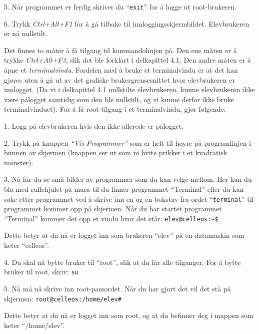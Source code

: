 \item{5.} N\aa r programmet er ferdig skriver du ``{\tt exit}'' for \aa{} logge ut root-brukeren.

\item{6.} Trykk {\it Ctrl+Alt+F1} for \aa{} g\aa{} tilbake til inn\-loggings\-skjerm\-bildet. Elev\-brukeren er n\aa{} nullstilt.


Det finnes to m\aa ter \aa{} f\aa{} tilgang til kommando\-linjen p\aa . Den ene m\aa ten er \aa{} trykke {\it Ctrl+Alt+F3}, slik det ble forklart i delkapittel 4.1. Den andre m\aa ten er \aa{} \aa pne et {\it terminalvindu}. Fordelen med \aa{} bruke et terminalvindu er at det kan gj\o res uten \aa{} g\aa{} ut av det grafiske brukergrensesnittet hvor elevbrukeren er innlogget. (Da vi i delkapittel 4.1 nullstilte elevbrukeren, kunne elevbrukeren ikke v\ae re p\aa logget samtidig som den ble nullstilt, og vi kunne derfor ikke bruke terminalvinduet). For \aa{} f\aa{} root-tilgang i et terminalvindu, gj\o r f\o lgende:
\item{1.} Logg p\aa{} elevbrukeren hvis den ikke allerede er p\aa logget.
\item{2.} Trykk p\aa{} knappen {\it ``Vis Programmer''} som er helt til h\o yre p\aa{} programlinjen i bunnen av skjermen (knappen ser ut som ni hvite prikker i et kvadratisk m\o nster).
\item{3.} N\aa{} f\aa r du se sm\aa{} bilder av programmer som du kan velge mellom. Her kan du bla med rullehjulet p\aa{} musa til du finner programmet ``Terminal'' eller du kan s\o ke etter programmet ved \aa{} skrive inn en og en bokstav fra ordet ``{\tt terminal}'' til programmet kommer opp p\aa{} skjermen. N\aa r du har startet programmet ``Terminal'' kommer det opp et vindu hvor det st\aa r:
\medskip
{\tt elev@celleos:\~{}\$}
\medskip
\item{} Dette betyr at du n\aa{} er logget inn som brukeren ``elev'' p\aa{} en datamaskin som heter ``celleos''.
\item{4.} Du skal n\aa{} bytte bruker til ``root'', slik at du f\aa r alle tilganger. For \aa{} bytte bruker til root, skriv:
\medskip
{\tt su}
\medskip
\item{5.} N\aa{} m\aa{} n\aa{} skrive inn root-passordet. N\aa r du har gjort det vil det st\aa{} p\aa{} skjermen:
\medskip
{\tt root@celleos:/home/elev\#}
\medskip
\item{} Dette betyr at du n\aa{} er logget inn som root, og at du befinner deg i mappen som heter ``/home/elev''.

